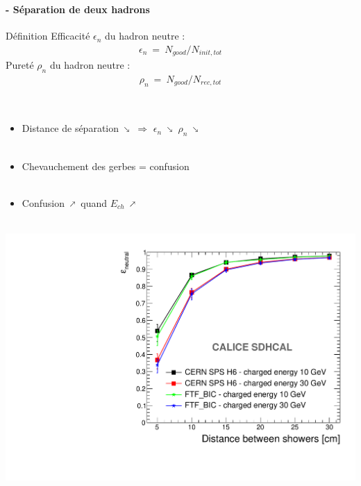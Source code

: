\documentclass[8pt]{beamer}
\makeatletter
\newcommand{\fixed@sra}{$\vrule height 2\fontdimen22\textfont2 width 0pt\shortrightarrow$}
\newcommand{\shortarrow}[1]{%
  \mathrel{\text{\rotatebox[origin=c]{\numexpr#1*45}{\fixed@sra}}}
}
\makeatother
\begin{document}
  \begin{frame}
  \frametitle{\secname}
  \framesubtitle{\subsecname - Séparation de deux hadrons}
    \begin{minipage}{0.48\linewidth}
      \begin{block}{Définition}
        Efficacité $\epsilon_n$ du hadron neutre :
        \begin{align*}
          \epsilon_n~=~N_{good} / N_{init,tot}
        \end{align*}
        Pureté $\rho_n$ du hadron neutre :
        \begin{align*}
          \rho_n~=~N_{good} / N_{rec,tot}
        \end{align*}
      \end{block}
      ~ \\
      \begin{itemize}
        \item Distance de séparation $\shortarrow{7}$ $\Rightarrow$ $\epsilon_n$ $\shortarrow{7}$ $\rho_n$ $\shortarrow{7}$ \\
        ~ \\
        \item Chevauchement des gerbes = confusion \\
        ~ \\
        \item Confusion $\shortarrow{1}$ quand $E_{ch}$ $\shortarrow{1}$
      \end{itemize}
    \end{minipage}
    \begin{minipage}{0.48\linewidth}
      \begin{center}
        ~~~~~~~~~~~~\centering \includegraphics[width=0.8\linewidth]{OverlayEvent_Efficiency.pdf} \\

\end{center}
\end{minipage}
\end{frame}
\end{document}
